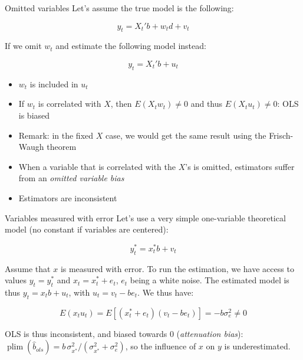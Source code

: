 \documentclass[aspectratio=169]{beamer}
\DeclareMathOperator{\plim}{plim}
\begin{document}
\begin{frame}{Omitted variables}
Let's assume the true model is the following:

\[y_t = X_t'b + w_td + v_t\]

If we omit $w_t$ and estimate the following model instead:

\[y_t = X_t'b + u_t\]

\begin{itemize}
    \item $w_t$ is included in $u_t$
    \item If $w_t$ is correlated with $X$, then $E(X_tw_t) \neq 0$ and thus $E(X_tu_t) \neq 0$: OLS is biased
    \item Remark: in the fixed $X$ case, we would get the same result using the Frisch-Waugh theorem
    \item When a variable that is correlated with the $X$'s is omitted, estimators suffer from an \emph{omitted variable bias}
    \item Estimators are inconsistent
\end{itemize}
\end{frame}

\begin{frame}{Variables measured with error}
Let's use a very simple one-variable theoretical model (no constant if variables are centered):

\[y_t^* = x_t^* b + v_t\]

Assume that $x$ is measured with error. To run the estimation, we have access to values $y_t = y_t^*$ and $x_t = x_t^* + e_t$, $e_t$ being a white noise. The estimated model is thus $y_t = x_t b + u_t$, with $u_t = v_t - be_t$. We thus have:

\[E(x_tu_t) = E[(x_t^* + e_t)(v_t - be_t)] = -b\sigma_e^2 \neq 0\]

OLS is thus inconsistent, and biased towards 0 (\textit{attenuation bias}): $\plim(\hat{b}_{ols}) = b\,\sigma_{x^*}^2/(\sigma_{x^*}^2 + \sigma_e^2)$, so the influence of $x$ on $y$ is underestimated.
\end{frame}
\end{document}
